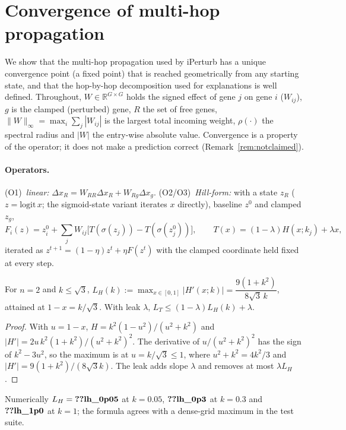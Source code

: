 \section{Convergence of multi-hop propagation}
\label{app:convergence}
We show that the multi-hop propagation used by iPerturb has a unique convergence point (a fixed point) that is reached geometrically from any starting state, and that the hop-by-hop decomposition used for explanations is well defined. Throughout, $W\in\mathbb{R}^{G\times G}$ holds the signed effect of gene $j$ on gene $i$ ($W_{ij}$), $g$ is the clamped (perturbed) gene, $R$ the set of free genes, $\|W\|_\infty=\max_i\sum_j|W_{ij}|$ is the largest total incoming weight, $\rho(\cdot)$ the spectral radius and $|W|$ the entry-wise absolute value. Convergence is a property of the operator; it does not make a prediction correct (Remark~\ref{rem:notclaimed}).

\paragraph{Operators.} (O1)~\emph{linear:} $\Delta x_R=W_{RR}\Delta x_R+W_{Rg}\Delta x_g$. (O2/O3)~\emph{Hill-form:} with a state $z_R$ ($z=\mathrm{logit}\,x$; the sigmoid-state variant iterates $x$ directly), baseline $z^0$ and clamped $z_g$,
\begin{equation}
F_i(z)=z^0_i+\sum_{j}W_{ij}\big[T(\sigma(z_j))-T(\sigma(z^0_j))\big],\qquad T(x)=(1-\lambda)H(x;k_j)+\lambda x,
\label{eq:Fmap}
\end{equation}
iterated as $z^{t+1}=(1-\eta)z^t+\eta F(z^t)$ with the clamped coordinate held fixed at every step.

\begin{lemma}\label{lem:hill}
For $n=2$ and $k\le\sqrt3$, $L_H(k):=\max_{x\in[0,1]}|H'(x;k)|=\dfrac{9(1+k^2)}{8\sqrt3\,k}$, attained at $1-x=k/\sqrt3$. With leak $\lambda$, $L_T\le(1-\lambda)L_H(k)+\lambda$.
\end{lemma}
\begin{proof}
With $u=1-x$, $H=k^2(1-u^2)/(u^2+k^2)$ and $|H'|=2u\,k^2(1+k^2)/(u^2+k^2)^2$. The derivative of $u/(u^2+k^2)^2$ has the sign of $k^2-3u^2$, so the maximum is at $u=k/\sqrt3\le1$, where $u^2+k^2=4k^2/3$ and $|H'|=9(1+k^2)/(8\sqrt3k)$. The leak adds slope $\lambda$ and removes at most $\lambda L_H$.
\end{proof}
Numerically $L_H=\datanum{lh_0p05}$ at $k=0.05$, $\datanum{lh_0p3}$ at $k=0.3$ and $\datanum{lh_1p0}$ at $k=1$; the formula agrees with a dense-grid maximum in the test suite.


